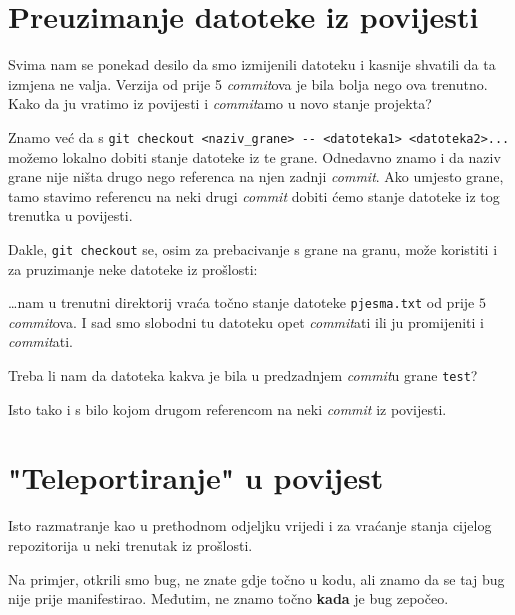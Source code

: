 

\section*{Preuzimanje datoteke iz povijesti}

Svima nam se ponekad desilo da smo izmijenili datoteku i kasnije shvatili da ta izmjena ne valja. 
Verzija od prije 5 \emph{commit}ova je bila bolja nego ova trenutno.
Kako da ju vratimo iz povijesti i \emph{commit}amo u novo stanje projekta?

Znamo već da s \verb+git checkout <naziv_grane> -- <datoteka1> <datoteka2>...+ možemo lokalno dobiti stanje datoteke iz te grane.
Odnedavno znamo i da naziv grane nije ništa drugo nego referenca na njen zadnji \emph{commit}.
Ako umjesto grane, tamo stavimo referencu na neki drugi \emph{commit} dobiti ćemo stanje datoteke iz tog trenutka u povijesti.

Dakle, \verb+git checkout+ se, osim za prebacivanje s grane na granu, može koristiti i za pruzimanje neke datoteke iz prošlosti:


\dots{}nam u trenutni direktorij vraća točno stanje datoteke \verb+pjesma.txt+ od prije $5$ \emph{commit}ova.
I sad smo slobodni tu datoteku opet \emph{commit}ati ili ju promijeniti i \emph{commit}ati.

Treba li nam da datoteka kakva je bila u predzadnjem \emph{commit}u grane \verb+test+?


Isto tako i s bilo kojom drugom referencom na neki \emph{commit} iz povijesti.

\section*{"Teleportiranje" u povijest}

Isto razmatranje kao u prethodnom odjeljku vrijedi i za vraćanje stanja cijelog repozitorija u neki trenutak iz prošlosti.

Na primjer, otkrili smo bug, ne znate gdje točno u kodu, ali znamo da se taj bug nije prije manifestirao. 
Međutim, ne znamo točno \textbf{kada} je bug zepočeo.

